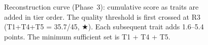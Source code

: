 \begin{figure}[tbp]

\caption{Reconstruction curve (Phase~3): cumulative score as traits are added
  in tier order. The quality threshold is first crossed at R3
  (T1+T4+T5 = 35.7/45, $\bigstar$). Each subsequent trait adds
  1.6--5.4 points. The minimum sufficient set is T1 + T4 + T5.}
\label{fig:reconstruction}
\end{figure}
